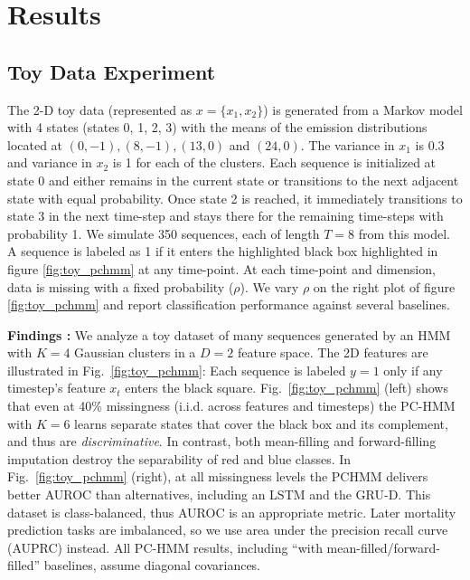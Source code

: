 \section{Results}
\subsection{Toy Data Experiment}
\label{app_toy_data_gen}
The 2-D toy data (represented as $x=\{x_1, x_2\}$) is generated from a Markov model with 4 states (states 0, 1, 2, 3) with the means of the emission distributions located at $(0, -1), (8, -1), (13, 0)$ and $(24, 0)$. The variance in $x_1$ is 0.3 and variance in $x_2$ is 1 for each of the clusters. Each sequence is initialized at state 0 and either remains in the current state or transitions to the next adjacent state with equal probability. Once state 2 is reached, it immediately transitions to state 3 in the next time-step and stays there for the remaining time-steps with probability 1. We simulate 350 sequences, each of length $T=8$ from this model. A sequence is labeled as 1 if it enters the highlighted black box highlighted in figure \ref{fig:toy_pchmm} at any time-point. At each time-point and dimension, data is missing with a fixed probability ($\rho$). We vary $\rho$ on the right plot of figure \ref{fig:toy_pchmm} and report classification performance against several baselines. 

\textbf{Findings :}
We analyze a toy dataset of many sequences generated by an HMM with $K=4$ Gaussian clusters in a $D=2$ feature space. The 2D features are illustrated in Fig.~\ref{fig:toy_pchmm}:
Each sequence is labeled $y=1$ only if any timestep's feature $x_t$ enters the black square.
Fig.~\ref{fig:toy_pchmm} (left) shows that even at 40\% missingness (i.i.d. across features and timesteps) the PC-HMM with $K=6$ learns separate states that cover the black box and its complement, and thus are \emph{discriminative}.
In contrast, both mean-filling and forward-filling imputation destroy the separability of red and blue classes. 
In Fig.~\ref{fig:toy_pchmm} (right), at all missingness levels the PCHMM delivers better AUROC than alternatives, including an LSTM and the GRU-D. This dataset is class-balanced, thus AUROC is an appropriate metric. Later mortality prediction tasks are imbalanced, so we use area under the precision recall curve (AUPRC) instead.
All PC-HMM results, including ``with mean-filled/forward-filled'' baselines, assume diagonal covariances.



